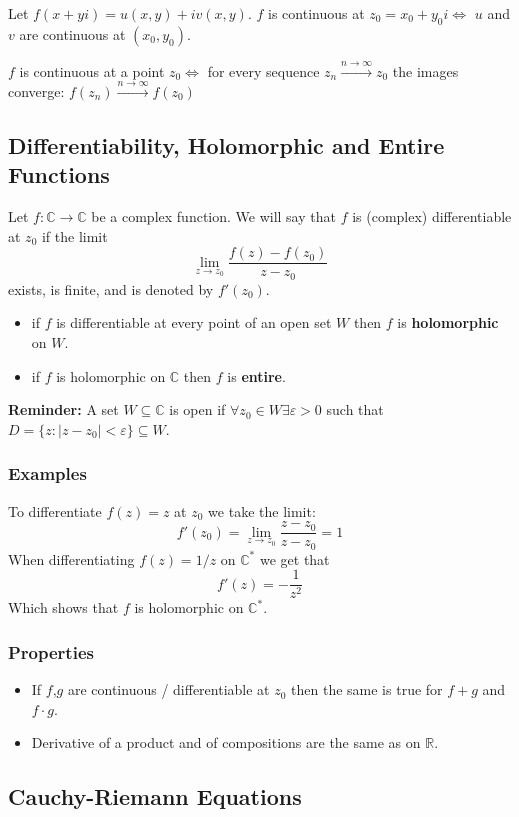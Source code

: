 Let $f(x+yi) = u(x,y)+iv(x,y)$. $f$ is continuous at $z_0=x_0+y_0i\Leftrightarrow$ $u$ and $v$ are continuous at $(x_0,y_0)$.

$f$ is continuous at a point $z_0\Leftrightarrow$ for every sequence $z_n\stackrel{n\to\infty}\to z_0$ the images converge: $f(z_n)\stackrel{n\to\infty}\to f(z_0)$ 

\subsection{Differentiability, Holomorphic and Entire Functions}
Let $f:\mathbb C \to\mathbb C$ be a complex function. We will say that $f$ is (complex) differentiable at $z_0$ if the limit $$\lim_{z\to z_0} \frac{f(z)-f(z_0)}{z-z_0}$$ exists, is finite, and is denoted by $f'(z_0)$.

\begin{itemize}
    \item if $f$ is differentiable at every point of an open set $W$ then $f$ is \textbf{holomorphic} on $W$.
    \item if $f$ is holomorphic on $\mathbb C$ then $f$ is \textbf{entire}.
\end{itemize}
\textbf{Reminder:} A set $W\subseteq \mathbb C$ is open if $\forall z_0 \in W\exists \varepsilon > 0$ such that $D=\{z:|z-z_0|<\varepsilon\}\subseteq W$.

\subsubsection{Examples}
To differentiate $f(z)=z$ at $z_0$ we take the limit:
$$
f'(z_0) = \lim_{z\to z_0} \frac{z-z_0}{z-z_0} = 1
$$
When differentiating $f(z)=1/z$ on $\mathbb C^\ast$ we get that $$f'(z)=-\frac 1{z^2}$$ Which shows that $f$ is holomorphic on $\mathbb C^\ast$.

\subsubsection{Properties}
\begin{itemize}
    \item If $f$,$g$ are continuous / differentiable at $z_0$ then the same is true for $f+g$ and $f\cdot g$.
    \item Derivative of a product and of compositions are the same as on $\mathbb{R}$.
\end{itemize}

\subsection{Cauchy-Riemann Equations}
